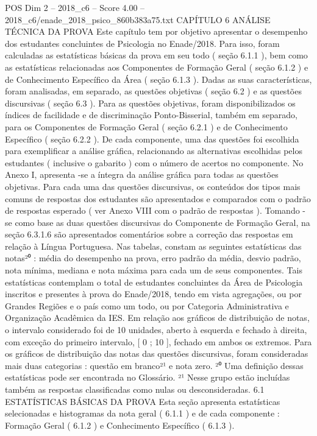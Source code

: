 \begin{textsample}{POS Dim 2 – 2018\_c6 – Score 4.00 – 2018\_c6/enade\_2018\_psico\_860b383a75.txt}  \label{ex:f2_pos_190}
CAPÍTULO 6 ANÁLISE TÉCNICA DA PROVA Este capítulo tem por objetivo apresentar o desempenho dos estudantes concluintes de Psicologia no Enade/2018.
Para isso, foram calculadas as estatísticas básicas da prova em seu todo ( seção 6.1.1 ), bem como as estatísticas relacionadas aos Componentes de Formação Geral ( seção 6.1.2 ) e de Conhecimento Específico da Área ( seção 6.1.3 ).
Dadas as suas características, foram analisadas, em separado, as questões objetivas ( seção 6.2 ) e as questões discursivas ( seção 6.3 ).
Para as questões objetivas, foram disponibilizados os índices de facilidade e de discriminação Ponto-Bisserial, também em separado, para os Componentes de Formação Geral ( seção 6.2.1 ) e de Conhecimento Específico ( seção 6.2.2 ).
De cada componente, uma das questões foi escolhida para exemplificar a análise gráfica, relacionando as alternativas escolhidas pelos estudantes ( inclusive o gabarito ) com o número de acertos no componente.
No Anexo I, apresenta -se a íntegra da análise gráfica para todas as questões objetivas.
Para cada uma das questões discursivas, os conteúdos dos tipos mais comuns de respostas dos estudantes são apresentados e comparados com o padrão de respostas esperado ( ver Anexo VIII com o padrão de respostas ).
Tomando -se como base as duas questões discursivas do Componente de Formação Geral, na seção 6.3.1.6 são apresentados comentários sobre a correção das respostas em relação à Língua Portuguesa.
Nas tabelas, constam as seguintes estatísticas das notas²⁰ : média do desempenho na prova, erro padrão da média, desvio padrão, nota mínima, mediana e nota máxima para cada um de seus componentes.
Tais estatísticas contemplam o total de estudantes concluintes da Área de Psicologia inscritos e presentes à prova do Enade/2018, tendo em vista agregações, ou por Grandes Regiões e o país como um todo, ou por Categoria Administrativa e Organização Acadêmica da IES.
Em relação aos gráficos de distribuição de notas, o intervalo considerado foi de 10 unidades, aberto à esquerda e fechado à direita, com exceção do primeiro intervalo, [ 0 ; 10 ], fechado em ambos os extremos.
Para os gráficos de distribuição das notas das questões discursivas, foram consideradas mais duas categorias : questão em branco²¹ e nota zero. ²⁰ Uma definição dessas estatísticas pode ser encontrada no Glossário. ²¹ Nesse grupo estão incluídas também as respostas classificadas como nulas ou desconsideradas. 6.1 ESTATÍSTICAS BÁSICAS DA PROVA Esta seção apresenta estatísticas selecionadas e histogramas da nota geral ( 6.1.1 ) e de cada componente : Formação Geral ( 6.1.2 ) e Conhecimento Específico ( 6.1.3 ).

\end{textsample}
